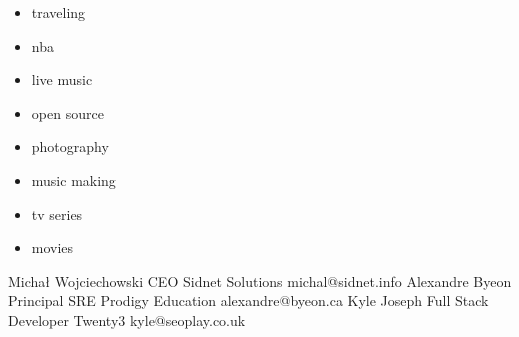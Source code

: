 \documentclass[localFont,alternative,10pt]{yaac-another-awesome-cv}
\begin{document}
  \twocolumnsection
  {
    \begin{skills}
    \end{skills}}
  {
    \vspace{1em}
    \begin{multicols}{2}
      \begin{itemize}
        \item traveling
        \item nba
        \item live music
        \item open source
        \item photography
        \item music making
        \item tv series
        \item movies
      \end{itemize}
    \end{multicols}
  }

  \vspace{0.5em}

  \begin{referees}
      {Michał Wojciechowski}
      {CEO}
      {Sidnet Solutions}
      {michal@sidnet.info}
      {Alexandre Byeon}
      {Principal SRE}
      {Prodigy Education}
      {alexandre@byeon.ca}
      {Kyle Joseph}
      {Full Stack Developer}
      {Twenty3}
      {kyle@seoplay.co.uk}
  \end{referees}
\end{document}
